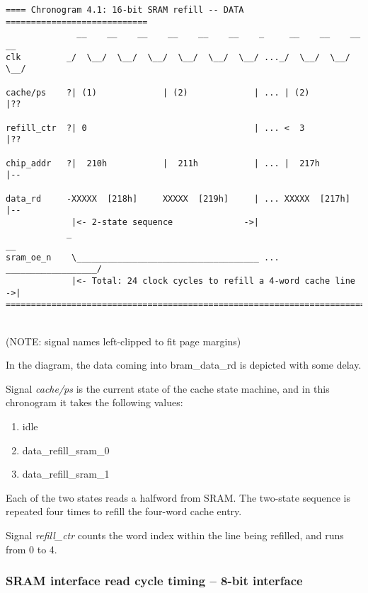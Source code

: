 \begin{verbatim}
==== Chronogram 4.1: 16-bit SRAM refill -- DATA ============================
              __    __    __    __    __    __    _     __    __    __    __
clk         _/  \__/  \__/  \__/  \__/  \__/  \__/ ..._/  \__/  \__/  \__/ 

cache/ps    ?| (1)             | (2)             | ... | (2)             |??

refill_ctr  ?| 0                                 | ... <  3              |??

chip_addr   ?|  210h           |  211h           | ... |  217h           |--

data_rd     -XXXXX  [218h]     XXXXX  [219h]     | ... XXXXX  [217h]     |-- 
             |<- 2-state sequence              ->| 
            _                                                             __
sram_oe_n    \____________________________________ ... __________________/  
             |<- Total: 24 clock cycles to refill a 4-word cache line  ->|  
============================================================================
\end{verbatim}\\

(NOTE: signal names left-clipped to fit page margins)

In the diagram, the data coming into bram\_data\_rd is depicted with some delay.

Signal \emph{cache/ps} is the current state of the cache state machine, and
in this chronogram it takes the following values:

\begin{enumerate}
\item idle
\item data\_refill\_sram\_0
\item data\_refill\_sram\_1
\end{enumerate}

Each of the two states reads a halfword from SRAM. The two-state sequence is 
repeated four times to refill the four-word cache entry.

Signal \emph{refill\_ctr} counts the word index within the line being refilled,
and runs from 0 to 4.\\


\subsubsection{SRAM interface read cycle timing -- 8-bit interface}
\label{sram_read_cycle_8b}

